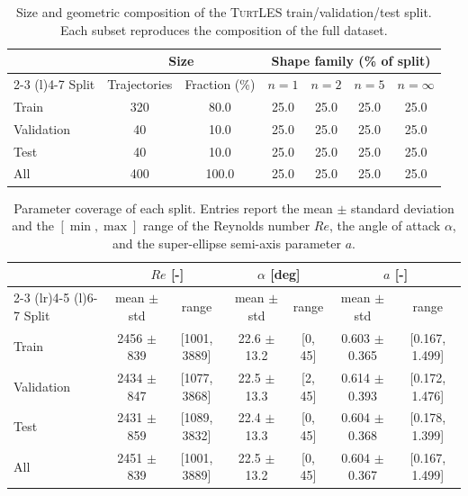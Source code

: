 \documentclass{article}
\begin{document}
\begin{table}[t]
    \centering
    \color{revcolor}
    \caption{Size and geometric composition of the \textsc{TurtLES} train/validation/test split. Each subset reproduces the composition of the full dataset.}
    \label{tab:split_composition}
    \small
    \setlength{\tabcolsep}{5.5pt}
    \begin{tabular*}{\linewidth}{@{\extracolsep{\fill}}lcccccc@{}}
        \toprule
        & \multicolumn{2}{c}{Size}
        & \multicolumn{4}{c}{Shape family (\% of split)} \\
        \cmidrule(lr){2-3}
        \cmidrule(l){4-7}
        Split
        & Trajectories
        & Fraction (\%)
        & $n = 1$
        & $n = 2$
        & $n = 5$
        & $n = \infty$ \\
        \midrule
        Train & 320 & 80.0 & 25.0 & 25.0 & 25.0 & 25.0 \\
        Validation & 40 & 10.0 & 25.0 & 25.0 & 25.0 & 25.0 \\
        Test & 40 & 10.0 & 25.0 & 25.0 & 25.0 & 25.0 \\
        \midrule
        All & 400 & 100.0 & 25.0 & 25.0 & 25.0 & 25.0 \\
        \bottomrule
    \end{tabular*}
\end{table}

\begin{table}[t]
    \centering
    \color{revcolor}
    \caption{Parameter coverage of each split. Entries report the mean $\pm$ standard deviation and the $[\min, \max]$ range of the Reynolds number $Re$, the angle of attack $\alpha$, and the super-ellipse semi-axis parameter $a$.}
    \label{tab:split_parameters}
    \small
    \setlength{\tabcolsep}{4pt}
    \begin{tabular*}{\linewidth}{@{\extracolsep{\fill}}lcccccc@{}}
        \toprule
        & \multicolumn{2}{c}{$Re$ [-]}
        & \multicolumn{2}{c}{$\alpha$ [deg]}
        & \multicolumn{2}{c}{$a$ [-]} \\
        \cmidrule(lr){2-3}
        \cmidrule(lr){4-5}
        \cmidrule(l){6-7}
        Split
        & mean $\pm$ std & range
        & mean $\pm$ std & range
        & mean $\pm$ std & range \\
        \midrule
        Train & 2456 $\pm$ 839 & [1001, 3889] & 22.6 $\pm$ 13.2 & [0, 45] & 0.603 $\pm$ 0.365 & [0.167, 1.499] \\
        Validation & 2434 $\pm$ 847 & [1077, 3868] & 22.5 $\pm$ 13.3 & [2, 45] & 0.614 $\pm$ 0.393 & [0.172, 1.476] \\
        Test & 2431 $\pm$ 859 & [1089, 3832] & 22.4 $\pm$ 13.3 & [0, 45] & 0.604 $\pm$ 0.368 & [0.178, 1.399] \\
        \midrule
        All & 2451 $\pm$ 839 & [1001, 3889] & 22.5 $\pm$ 13.2 & [0, 45] & 0.604 $\pm$ 0.367 & [0.167, 1.499] \\
        \bottomrule
    \end{tabular*}
\end{table}
\end{document}
